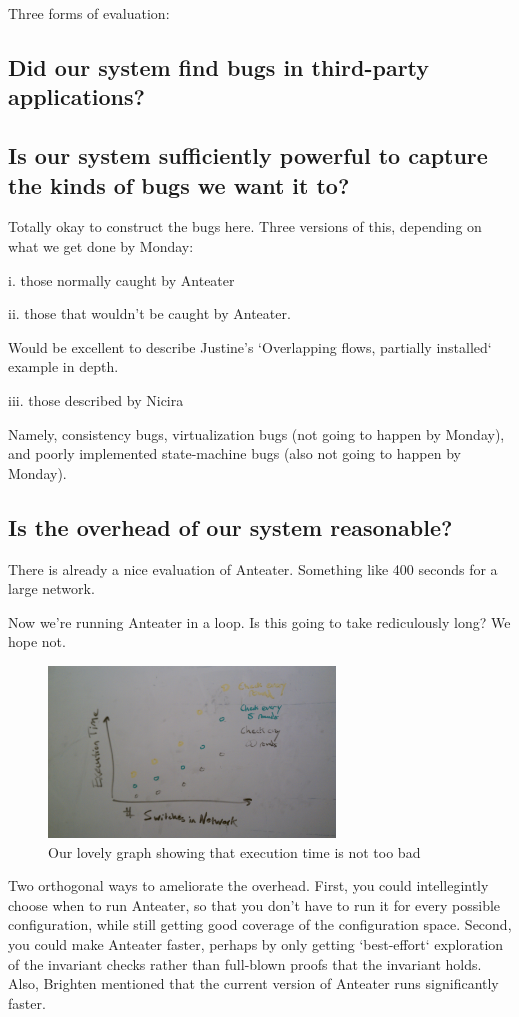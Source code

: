 Three forms of evaluation:

\subsection{Did our system find bugs in third-party applications?}

\subsection{Is our system sufficiently powerful to capture the kinds of bugs we want
it to?}

Totally okay to construct the bugs here. Three versions of this, depending on what we get done by Monday:

i. those normally caught by Anteater 

ii. those that wouldn't be caught by Anteater.

Would be excellent to describe Justine's `Overlapping flows, partially
installed` example in depth.

iii. those described by Nicira

Namely, consistency bugs, virtualization bugs (not going to happen by Monday),
and poorly implemented state-machine bugs (also not going to happen by
Monday).


\subsection{Is the overhead of our system reasonable?}

There is already a nice evaluation of Anteater. Something like 400 seconds for
a large network.

Now we're running Anteater in a
loop. Is this going to take rediculously long? We hope not.

\begin{figure}[t]
    \centering
    \includegraphics[width=3in]{../graphs/mock_overhead_graph.jpg}
    \caption[]{\label{fig:loop} Our lovely graph showing that execution time
    is not too bad\vspace{-10pt}} 
\end{figure}

Two orthogonal ways to ameliorate the overhead. First, you could intellegintly choose
when to run Anteater, so that you don't have to run it for every possible
configuration, while still getting good coverage of the
configuration space. Second, you could make Anteater faster, perhaps by only
getting `best-effort` exploration of the invariant checks rather than
full-blown proofs that the invariant holds. Also, Brighten mentioned that the
current version of Anteater runs significantly faster.
